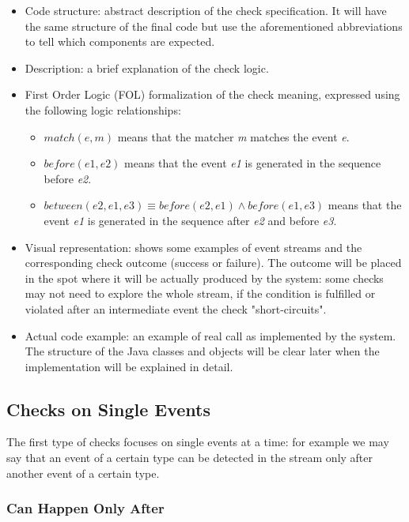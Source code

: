 \documentclass[11pt,a4paper,notitlepage]{article}
\begin{document}
\begin{itemize}
	\item Code structure: abstract description of the check specification. It will have the same structure of the final code but use the aforementioned abbreviations to tell which components are expected.
	\item Description: a brief explanation of the check logic.
	\item First Order Logic (FOL) formalization of the check meaning, expressed using the following logic relationships:
	\begin{itemize}
		\item $match(e, m)$ means that the matcher \textit{m} matches the event \textit{e}.
		\item $before(e1, e2)$ means that the event \textit{e1} is generated in the sequence before \textit{e2}.
		\item $between(e2, e1, e3) \equiv before(e2, e1) \land before(e1, e3)$ means that the event \textit{e1} is generated in the sequence after \textit{e2} and before 		\textit{e3}.
	\end{itemize}
	\item Visual representation: shows some examples of event streams and the corresponding check outcome (success or failure). The outcome will be placed in the spot where it will be actually produced by the system: some checks may not need to explore the whole stream, if the condition is fulfilled or violated after an intermediate event the check "short-circuits".
	\item Actual code example: an example of real call as implemented by the system. The structure of the Java classes and objects will be clear later when the implementation will be explained in detail.
\end{itemize}


\subsection{Checks on Single Events}

The first type of checks focuses on single events at a time: for example we may say that an event of a certain type can be detected in the stream only after another event of a certain type.

\subsubsection{Can Happen Only After}
\end{document}
